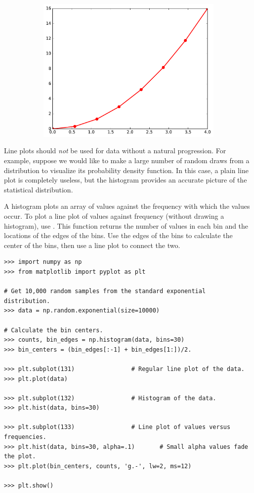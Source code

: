 \begin{figure}[H]
\begin{subfigure}{.325\textwidth}
    \includegraphics[width=\linewidth]{figures/line_vs_scatter_both.pdf}
\end{subfigure}
\end{figure}

Line plots should \emph{not} be used for data without a natural progression.
For example, suppose we would like to make a large number of random draws from a distribution to visualize its probability density function.
In this case, a plain line plot is completely useless, but the histogram provides an accurate picture of the statistical distribution.

A histogram plots an array of values against the frequency with which the values occur.
To plot a line plot of values against frequency (without drawing a histogram), use .
This function returns the number of values in each bin and the locations of the edges of the bins.
Use the edges of the bins to calculate the center of the bins, then use a line plot to connect the two.

\begin{lstlisting}
>>> import numpy as np
>>> from matplotlib import pyplot as plt

# Get 10,000 random samples from the standard exponential distribution.
>>> data = np.random.exponential(size=10000)

# Calculate the bin centers.
>>> counts, bin_edges = np.histogram(data, bins=30)
>>> bin_centers = (bin_edges[:-1] + bin_edges[1:])/2.

>>> plt.subplot(131)                # Regular line plot of the data.
>>> plt.plot(data)

>>> plt.subplot(132)                # Histogram of the data.
>>> plt.hist(data, bins=30)

>>> plt.subplot(133)                # Line plot of values versus frequencies.
>>> plt.hist(data, bins=30, alpha=.1)       # Small alpha values fade the plot.
>>> plt.plot(bin_centers, counts, 'g.-', lw=2, ms=12)

>>> plt.show()
\end{lstlisting}

